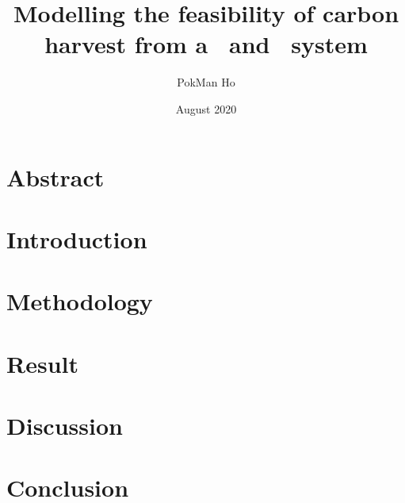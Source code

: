\documentclass[a4paper,11pt]{article}
\title{Modelling the feasibility of carbon harvest from a \phy\ and \bac\ system}
\author{PokMan Ho}
\date{August 2020}
\begin{document}
\maketitle



\section{Abstract}


\section{Introduction}


\section{Methodology}


\section{Result}


\section{Discussion}



\section{Conclusion}




\nocite{*}\printbibliography
\clearpage

\end{document}
